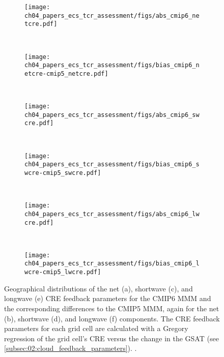 \begin{figure}[p]
  \centering
  \begin{subfigure}[b]{\SubfigureWidth{}}
    \texttt{[image: 
      ch04\_papers\_ecs\_tcr\_assessment/figs/abs\_cmip6\_netcre.pdf]}
    \caption{}
    \label{fig:04:cloud_feedback_parameters:a}
  \end{subfigure}
  ~
  \begin{subfigure}[b]{\SubfigureWidth{}}
    \texttt{[image: 
      ch04\_papers\_ecs\_tcr\_assessment/figs/bias\_cmip6\_netcre-cmip5\_netcre.pdf]}
    \caption{}
    \label{fig:04:cloud_feedback_parameters:b}
  \end{subfigure}
  \\
  \begin{subfigure}[b]{\SubfigureWidth{}}
    \texttt{[image: 
      ch04\_papers\_ecs\_tcr\_assessment/figs/abs\_cmip6\_swcre.pdf]}
    \caption{}
    \label{fig:04:cloud_feedback_parameters:c}
  \end{subfigure}
  ~
  \begin{subfigure}[b]{\SubfigureWidth{}}
    \texttt{[image: 
      ch04\_papers\_ecs\_tcr\_assessment/figs/bias\_cmip6\_swcre-cmip5\_swcre.pdf]}
    \caption{}
    \label{fig:04:cloud_feedback_parameters:d}
  \end{subfigure}
  \\
  \begin{subfigure}[b]{\SubfigureWidth{}}
    \texttt{[image: 
      ch04\_papers\_ecs\_tcr\_assessment/figs/abs\_cmip6\_lwcre.pdf]}
    \caption{}
    \label{fig:04:cloud_feedback_parameters:e}
  \end{subfigure}
  ~
  \begin{subfigure}[b]{\SubfigureWidth{}}
    \texttt{[image: 
      ch04\_papers\_ecs\_tcr\_assessment/figs/bias\_cmip6\_lwcre-cmip5\_lwcre.pdf]}
    \caption{}
    \label{fig:04:cloud_feedback_parameters:f}
  \end{subfigure}
  \caption[
    Geographical distributions of the \acl{CRE} feedback parameters for the
    \acs{CMIP}5 and \acs{CMIP}6 \aclp{MMM}.
  ]{
    Geographical distributions of the net (a), shortwave (c), and longwave (e)
    \acf{CRE} feedback parameters for the \acs{CMIP}6 \acf{MMM} and the
    corresponding differences to the \acs{CMIP}5 \acs{MMM}, again for the net
    (b), shortwave (d), and longwave (f) components. The \acs{CRE} feedback
    parameters for each grid cell are calculated with a Gregory regression of
    the grid cell's \acs{CRE} versus the change in the \acl{GSAT} (see
    \cref{subsec:02:cloud_feedback_parameters}). .
  }
  \label{fig:04:cloud_feedback_parameters}
\end{figure}

